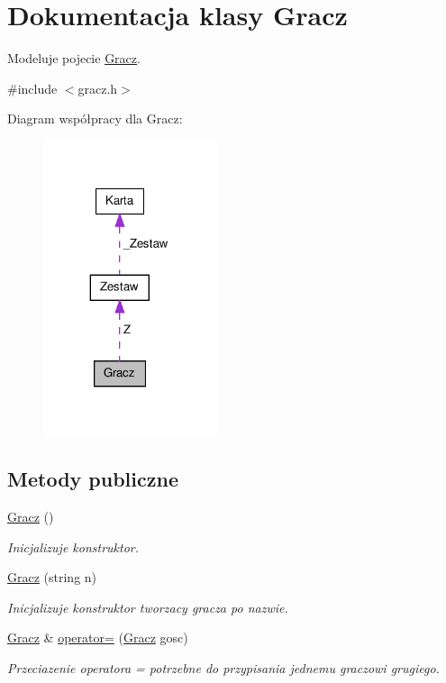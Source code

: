 \hypertarget{class_gracz}{\section{Dokumentacja klasy Gracz}
\label{class_gracz}
}


Modeluje pojecie \hyperlink{class_gracz}{Gracz}.  




{\ttfamily \#include $<$gracz.\-h$>$}



Diagram współpracy dla Gracz\-:\nopagebreak
\begin{figure}[H]
\begin{center}
\leavevmode
\includegraphics[width=145pt]{class_gracz__coll__graph}
\end{center}
\end{figure}
\subsection*{Metody publiczne}
\begin{DoxyCompactItemize}
\item 
\hyperlink{class_gracz_a460af0a2e2749e8c81ae86127320013a}{Gracz} ()
\begin{DoxyCompactList}\small\item\em Inicjalizuje konstruktor. \end{DoxyCompactList}\item 
\hyperlink{class_gracz_a220896a816e27a3a7425cee9f66c2ef1}{Gracz} (string n)
\begin{DoxyCompactList}\small\item\em Inicjalizuje konstruktor tworzacy gracza po nazwie. \end{DoxyCompactList}\item 
\hyperlink{class_gracz}{Gracz} \& \hyperlink{class_gracz_a2e678a26ad4b6e4c7ef63123e5dde2e0}{operator=} (\hyperlink{class_gracz}{Gracz} gosc)
\begin{DoxyCompactList}\small\item\em Przeciazenie operatora = potrzebne do przypisania jednemu graczowi grugiego. \end{DoxyCompactList}\end{DoxyCompactItemize}
